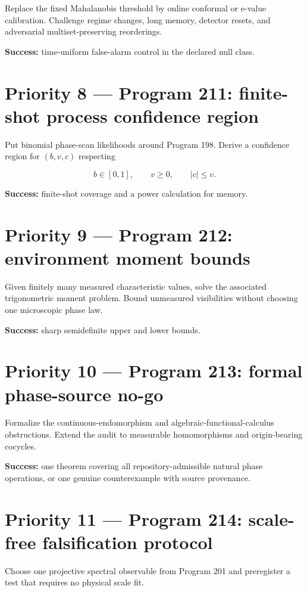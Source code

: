 \documentclass[11pt,a4paper,openany]{report}
\begin{document}
Replace the fixed Mahalanobis threshold by online conformal or e-value calibration. Challenge regime changes, long memory, detector resets, and adversarial multiset-preserving reorderings.

\textbf{Success:} time-uniform false-alarm control in the declared null class.

\section{Priority 8 --- Program 211: finite-shot process confidence region}

Put binomial phase-scan likelihoods around Program 198. Derive a confidence region for \((b,v,c)\) respecting

\[
b\in[0,1],
\qquad
v\ge0,
\qquad
|c|\le v.
\]

\textbf{Success:} finite-shot coverage and a power calculation for memory.

\section{Priority 9 --- Program 212: environment moment bounds}

Given finitely many measured characteristic values, solve the associated trigonometric moment problem. Bound unmeasured visibilities without choosing one microscopic phase law.

\textbf{Success:} sharp semidefinite upper and lower bounds.

\section{Priority 10 --- Program 213: formal phase-source no-go}

Formalize the continuous-endomorphism and algebraic-functional-calculus obstructions. Extend the audit to measurable homomorphisms and origin-bearing cocycles.

\textbf{Success:} one theorem covering all repository-admissible natural phase operations, or one genuine counterexample with source provenance.

\section{Priority 11 --- Program 214: scale-free falsification protocol}

Choose one projective spectral observable from Program 201 and preregister a test that requires no physical scale fit.
\end{document}
